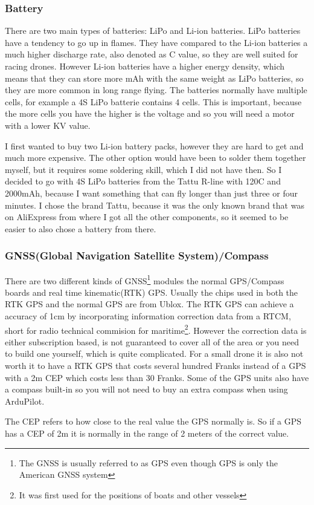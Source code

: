 \documentclass{article}
\begin{document}
	\subsubsection{Battery}
	There are two main types of batteries: \gls{LiPo} and \gls{Li-ion} batteries. \gls{LiPo} batteries have a tendency to go up in flames. They have compared to the \gls{Li-ion} batteries a much higher discharge rate, also denoted as C value, so they are well suited for racing drones. However \gls{Li-ion} batteries have a higher energy density, which means that they can store more mAh with the same weight as \gls{LiPo} batteries, so they are more common in long range flying. The batteries normally have multiple cells, for example a 4S \gls{LiPo} batterie contains 4 cells. This is important, because the more cells you have the higher is the voltage and so you will need a motor with a lower KV value. 
	
	I first wanted to buy two \gls{Li-ion} battery packs, however they are hard to get and much more expensive. The other option would have been to solder them together myself, but it requires some soldering skill, which I did not have then. So I decided to go with 4S \gls{LiPo} batteries from the Tattu R-line with 120C and 2000mAh\cite{tattu}, because I want something that can fly longer than just three or four minutes. I chose the brand Tattu, because it was the only known brand that was on AliExpress from where I got all the other components, so it seemed to be easier to also chose a battery from there. 
	

	\subsubsection{GNSS(Global Navigation Satellite System)/Compass}
	There are two different kinds of GNSS\footnote{The GNSS is usually referred to as GPS even though GPS is only the American GNSS system} modules the normal GPS/Compass boards and real time kinematic(RTK) GPS. Usually the chips used in both the RTK GPS and the normal GPS are from Ublox. The RTK GPS can achieve a accuracy of 1cm by incorporating information correction data from a RTCM, short for radio technical commision for maritime\footnote{It was first used for the positions of boats and other vessels}. However the correction data is either subscription based, is not guaranteed to cover all of the area or you need to build one yourself, which is quite complicated\cite{rtkgps}. For a small drone it is also not worth it to have a RTK GPS that costs several hundred Franks instead of a GPS with a 2m \gls{CEP} which costs less than 30 Franks. Some of the GPS units also have a compass built-in so you will not need to buy an extra compass when using ArduPilot. 
	\begin{Explanation}
		\item The \gls{CEP} refers to how close to the real value the \gls{GPS} normally is. So if a \gls{GPS} has a \gls{CEP}
		of 2m it is normally in the range of 2 meters of the correct value. \cite{CEP}
	\end{Explanation}
	
\end{document}
